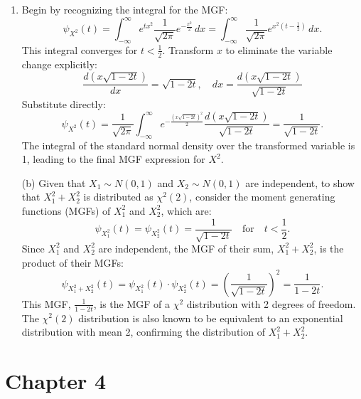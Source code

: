 \documentclass{article}
\begin{document}
\begin{enumerate}[label=(\alph*)]
    \item
    
    Begin by recognizing the integral for the MGF:
    \[
    \psi_{X^2}(t) = \int_{-\infty}^{\infty} e^{tx^2} \frac{1}{\sqrt{2\pi}} e^{-\frac{x^2}{2}} \, dx = \int_{-\infty}^{\infty} \frac{1}{\sqrt{2\pi}} e^{x^2(t - \frac{1}{2})} \, dx.
    \]
    This integral converges for \(t < \frac{1}{2}\). Transform \( x \) to eliminate the variable change explicitly:
    \[
    \frac{d(x\sqrt{1 - 2t})}{dx} = \sqrt{1 - 2t}, \quad dx = \frac{d(x\sqrt{1 - 2t})}{\sqrt{1 - 2t}}
    \]
    Substitute directly:
    \[
    \psi_{X^2}(t) = \frac{1}{\sqrt{2\pi}} \int_{-\infty}^{\infty} e^{-\frac{(x\sqrt{1 - 2t})^2}{2}} \frac{d(x\sqrt{1 - 2t})}{\sqrt{1 - 2t}} = \frac{1}{\sqrt{1 - 2t}}.
    \]
    The integral of the standard normal density over the transformed variable is 1, leading to the final MGF expression for \( X^2 \).
    \item[(b)] Given that \(X_1 \sim N(0, 1)\) and \(X_2 \sim N(0, 1)\) are independent, to show that \(X_1^2 + X_2^2\) is distributed as \(\chi^2(2)\), consider the moment generating functions (MGFs) of \(X_1^2\) and \(X_2^2\), which are:
    \[
    \psi_{X_1^2}(t) = \psi_{X_2^2}(t) = \frac{1}{\sqrt{1 - 2t}} \quad \text{for} \quad t < \frac{1}{2}.
    \]
    Since \(X_1^2\) and \(X_2^2\) are independent, the MGF of their sum, \(X_1^2 + X_2^2\), is the product of their MGFs:
    \[
    \psi_{X_1^2 + X_2^2}(t) = \psi_{X_1^2}(t) \cdot \psi_{X_2^2}(t) = \left(\frac{1}{\sqrt{1 - 2t}}\right)^2 = \frac{1}{1 - 2t}.
    \]
    This MGF, \(\frac{1}{1 - 2t}\), is the MGF of a \(\chi^2\) distribution with 2 degrees of freedom. The \(\chi^2(2)\) distribution is also known to be equivalent to an exponential distribution with mean 2, confirming the distribution of \(X_1^2 + X_2^2\).
\
\end{enumerate}



\section{Chapter 4}

\exercise
\end{document}
